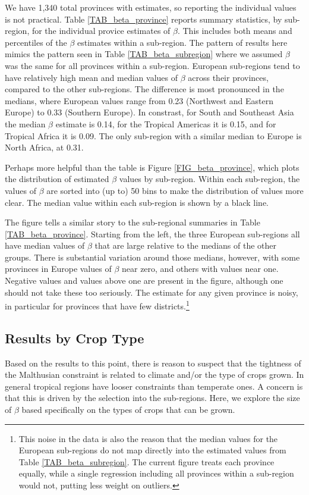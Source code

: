 \documentclass[11pt]{article}
\begin{document}
We have 1,340 total provinces with estimates, so reporting the individual values is not practical. Table \ref{TAB_beta_province} reports summary statistics, by sub-region, for the individual provice estimates of $\beta$. This includes both means and percentiles of the $\beta$ estimates within a sub-region. The pattern of results here mimics the pattern seen in Table \ref{TAB_beta_subregion} where we assumed $\beta$ was the same for all provinces within a sub-region. European sub-regions tend to have relatively high mean and median values of $\beta$ across their provinces, compared to the other sub-regions. The difference is most pronounced in the medians, where European values range from 0.23 (Northwest and Eastern Europe) to 0.33 (Southern Europe). In constrast, for South and Southeast Asia the median $\beta$ estimate is 0.14, for the Tropical Americas it is 0.15, and for Tropical Africa it is 0.09. The only sub-region with a similar median to Europe is North Africa, at 0.31. 

Perhaps more helpful than the table is Figure \ref{FIG_beta_province}, which plots the distribution of estimated $\beta$ values by sub-region. Within each sub-region, the values of $\beta$ are sorted into (up to) 50 bins to make the distribution of values more clear. The median value within each sub-region is shown by a black line. 

The figure tells a similar story to the sub-regional summaries in Table \ref{TAB_beta_province}. Starting from the left, the three European sub-regions all have median values of $\beta$ that are large relative to the medians of the other groups. There is substantial variation around those medians, however, with some provinces in Europe values of $\beta$ near zero, and others with values near one. Negative values and values above one are present in the figure, although one should not take these too seriously. The estimate for any given province is noisy, in particular for provinces that have few districts.\footnote{This noise in the data is also the reason that the median values for the European sub-regions do not map directly into the estimated values from Table \ref{TAB_beta_subregion}. The current figure treats each province equally, while a single regression including all provinces within a sub-region would not, putting less weight on outliers.}

\subsection{Results by Crop Type}
Based on the results to this point, there is reason to suspect that the tightness of the Malthusian constraint is related to climate and/or the type of crops grown. In general tropical regions have looser constraints than temperate ones. A concern is that this is driven by the selection into the sub-regions. Here, we explore the size of $\beta$ based specifically on the types of crops that can be grown.
\end{document}
